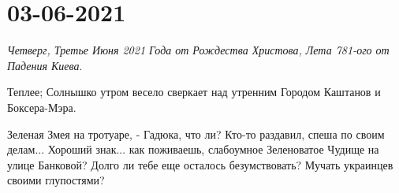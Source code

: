  
 
 
 
 
\section{03-06-2021}
\label{sec:kiev.pogoda.03_06_2021}

\emph{Четверг, Третье Июня 2021 Года от Рождества Христова, Лета 781-ого от Падения Киева}.

Теплее; Солнышко утром весело сверкает над утренним Городом Каштанов и
Боксера-Мэра.

Зеленая Змея на тротуаре, - Гадюка, что ли? Кто-то раздавил, спеша по своим
делам... Хороший знак... как поживаешь, слабоумное Зеленоватое Чудище на улице
Банковой?  Долго ли тебе еще осталось безумствовать? Мучать украинцев своими
глупостями?
